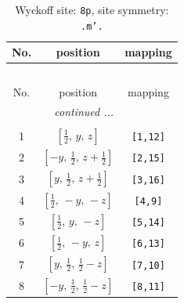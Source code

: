 \documentclass[fleqn,8pt]{jsarticle}
\begin{document}
\begin{longtable}{ccc}
\caption{Wyckoff site: {\tt 8p}, site symmetry: {\tt .m'.}}
 \\
 \hline \hline
No. & position & mapping \\ \hline \endfirsthead

\multicolumn{2}{l}{\tablename\ \thetable{}} \\
 \hline \hline
No. & position & mapping \\ \hline \endhead

 \hline \hline
\multicolumn{2}{r}{\footnotesize\it continued ...} \\ \endfoot

 \hline \hline
\multicolumn{2}{r}{} \\ \endlastfoot

1 & $\left[ \frac{1}{2},\, y,\, z \right]$ & {\tt [1,12]} \\ \hline
2 & $\left[ - y,\, \frac{1}{2},\, z + \frac{1}{2} \right]$ & {\tt [2,15]} \\ \hline
3 & $\left[ y,\, \frac{1}{2},\, z + \frac{1}{2} \right]$ & {\tt [3,16]} \\ \hline
4 & $\left[ \frac{1}{2},\, - y,\, - z \right]$ & {\tt [4,9]} \\ \hline
5 & $\left[ \frac{1}{2},\, y,\, - z \right]$ & {\tt [5,14]} \\ \hline
6 & $\left[ \frac{1}{2},\, - y,\, z \right]$ & {\tt [6,13]} \\ \hline
7 & $\left[ y,\, \frac{1}{2},\, \frac{1}{2} - z \right]$ & {\tt [7,10]} \\ \hline
8 & $\left[ - y,\, \frac{1}{2},\, \frac{1}{2} - z \right]$ & {\tt [8,11]} \\
\end{longtable}
\renewcommand{\arraystretch}{1.2}
\end{document}
